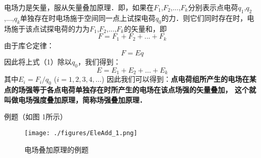电场力是矢量，服从矢量叠加原理．即，如果在$F_1$,$F_2$,...,$F_k$分别表示点电荷$q_1$,$q_2$,...,$q_k$单独存在时电场施于空间同一点上试探电荷$q_0$的力．则它们同时存在时，电场施于该点试探电荷的力为$F_1$,$F_2$,...,$F_k$的矢量和，即
\begin{equation}
F = F_1 +F_2 +...+F_k
\end{equation}
由于库仑定律：
\begin{equation}
  F = Eq
\end{equation}
因此将上式（1）除以$q_0$，我们得到： 
\begin{equation}
E = E_1 + E_2 + ... +E_k
\end{equation}
其中$E_i = F_i/q_0$      ($i=1, 2, 3, 4, ...$)
因此我们可以得到：\textbf{点电荷组所产生的电场在某点的场强等于各点电荷单独存在时所产生的电场在该点场强的矢量叠加， 这个就叫做电场强度叠加原理，简称场强叠加原理．}

例题（如图 1所示）
\begin{figure}[ht]
\centering
\texttt{[image: ./figures/EleAdd\_1.png]}
\caption{电场叠加原理的例题} \label{EleAdd_fig1}
\end{figure}